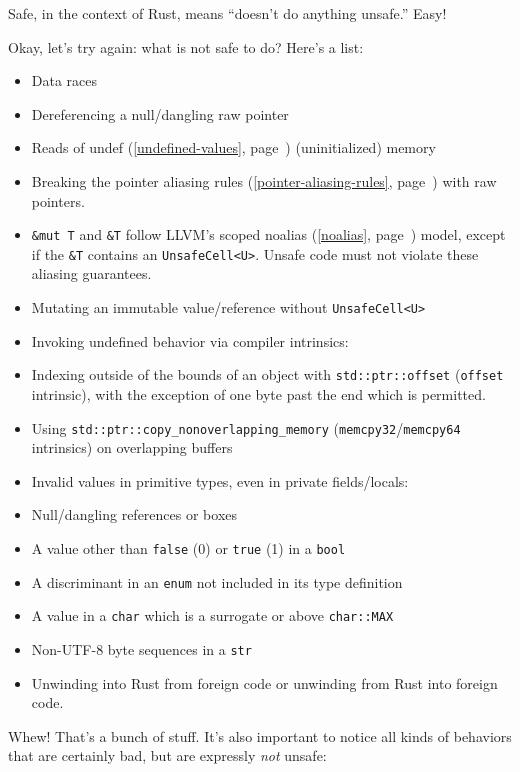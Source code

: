 \documentclass[a4paper,]{book}
\renewcommand*{\hyperref}[2][\ar]{%
  \def\ar{#2}%
  #2 (\autoref{#1}, page~\pageref{#1})}
\begin{document}
Safe, in the context of Rust, means ``doesn't do anything unsafe.''
Easy!

Okay, let's try again: what is not safe to do? Here's a list:

\begin{itemize}
\itemsep1pt\parskip0pt
\item
  Data races
\item
  Dereferencing a null/dangling raw pointer
\item
  Reads of \hyperref[undefined-values]{undef} (uninitialized) memory
\item
  Breaking the \hyperref[pointer-aliasing-rules]{pointer aliasing rules}
  with raw pointers.
\item
  \texttt{\&mut\ T} and \texttt{\&T} follow LLVM's scoped
  \hyperref[noalias]{noalias} model, except if the \texttt{\&T} contains
  an \texttt{UnsafeCell\textless{}U\textgreater{}}. Unsafe code must not
  violate these aliasing guarantees.
\item
  Mutating an immutable value/reference without
  \texttt{UnsafeCell\textless{}U\textgreater{}}
\item
  Invoking undefined behavior via compiler intrinsics:
\item
  Indexing outside of the bounds of an object with
  \texttt{std::ptr::offset} (\texttt{offset} intrinsic), with the
  exception of one byte past the end which is permitted.
\item
  Using \texttt{std::ptr::copy\_nonoverlapping\_memory}
  (\texttt{memcpy32}/\texttt{memcpy64} intrinsics) on overlapping
  buffers
\item
  Invalid values in primitive types, even in private fields/locals:
\item
  Null/dangling references or boxes
\item
  A value other than \texttt{false} (0) or \texttt{true} (1) in a
  \texttt{bool}
\item
  A discriminant in an \texttt{enum} not included in its type definition
\item
  A value in a \texttt{char} which is a surrogate or above
  \texttt{char::MAX}
\item
  Non-UTF-8 byte sequences in a \texttt{str}
\item
  Unwinding into Rust from foreign code or unwinding from Rust into
  foreign code.
\end{itemize}

Whew! That's a bunch of stuff. It's also important to notice all kinds
of behaviors that are certainly bad, but are expressly \emph{not}
unsafe:
\end{document}
